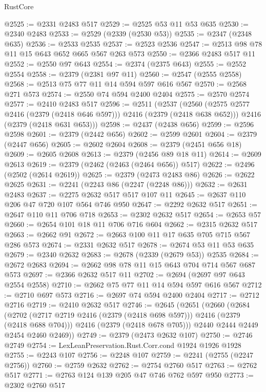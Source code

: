 \begin{lexlean}{RustCore}
\begin{coremodule}
@2525 := @2331 @2483 @517
@2529 := @2525 @53 @11 @53 @635
@2530 := @2340 @2483
@2533 := @2529 (@2339 (@2530 @53))
@2535 := @2347 (@2348 @635)
@2536 := @2533 @2535
@2537 := @2523 @2536
@2547 := @2513 @98 @78 @11 @15 @643 @652 @665 @567 @263 @573
@2550 := @2366 @2483 @517 @11
@2552 := @2550 @97 @643
@2554 := @2374 (@2375 @643)
@2555 := @2552 @2554
@2558 := @2379 (@2381 @97 @11)
@2560 := @2547 (@2555 @2558)
@2568 := @2513 @75 @77 @11 @14 @594 @597 @616 @567
@2570 := @2568 @271 @573
@2574 := @2550 @74 @594 @2400 @2404
@2575 := @2570 @2574
@2577 := @2410 @2483 @517
@2596 := @2511
    (@2537
      (@2560 (@2575 @2577 @2416 (@2379 (@2418 @646 @597))) @2416 (@2379 (@2418 @638 @652)))
      @2416
      (@2379 (@2418 @631 @653)))
@2598 := @2437 (@2438 @656)
@2599 := @2596 @2598
@2601 := @2379 (@2442 @656)
@2602 := @2599 @2601
@2604 := @2379 (@2447 @656)
@2605 := @2602 @2604
@2608 := @2379 (@2451 @656 @18)
@2609 := @2605 @2608
@2613 := @2379 (@2456 @89 @18 @11)
@2614 := @2609 @2613
@2619 := @2379 (@2462 (@2463 (@2464 @656)) @517)
@2622 := @2496 (@2502 (@2614 @2619))
@2625 := @2379 (@2473 @2483 @86)
@2626 := @2622 @2625
@2631 := @2241 (@2243 @86 (@2247 (@2248 @86)))
@2632 := @2631 @2483
@2637 := @2275 @2632 @517 @517 @107 @11
@2645 := @2637 @110 @206 @47 @720 @107 @564 @746 @950
@2647 := @2292 @2632 @517
@2651 := @2647 @110 @11 @706 @718
@2653 := @2302 @2632 @517
@2654 := @2653 @57
@2660 := @2654 @101 @18 @11 @706 @716 @604
@2662 := @2315 @2632 @517
@2663 := @2662 @91
@2672 := @2663 @100 @11 @17 @635 @705 @715 @567 @286 @573
@2674 := @2331 @2632 @517
@2678 := @2674 @53 @11 @53 @635
@2679 := @2340 @2632
@2683 := @2678 (@2339 (@2679 @53)) @2535
@2684 := @2672 @2683
@2694 := @2662 @98 @78 @11 @15 @643 @704 @714 @567 @687 @573
@2697 := @2366 @2632 @517 @11
@2702 := @2694 (@2697 @97 @643 @2554 @2558)
@2710 := @2662 @75 @77 @11 @14 @594 @597 @616 @567
@2712 := @2710 @697 @573
@2716 := @2697 @74 @594 @2400 @2404
@2717 := @2712 @2716
@2719 := @2410 @2632 @517
@2746 := @2645
    (@2651
      (@2660
        (@2684
          (@2702 (@2717 @2719 @2416 (@2379 (@2418 @698 @597))) @2416 (@2379 (@2418 @688 @704)))
          @2416
          (@2379 (@2418 @678 @705)))
        @2440
        @2444
        @2449
        @2454
        @2460
        @2469))
@2749 := @2379 (@2473 @2632 @107)
@2750 := @2746 @2749
@2754 := LexLeanPreservation.Rust.Corr.cond @1924 @1926 @1928
@2755 := @2243 @107
@2756 := @2248 @107
@2759 := @2241 (@2755 (@2247 @2756))
@2760 := @2759 @2632
@2762 := @2754 @2760 @517
@2763 := @2762 @517
@2771 := @2763 @124 @139 @205 @47 @746 @762 @597 @950
@2773 := @2302 @2760 @517

\end{coremodule}
\end{lexlean}
